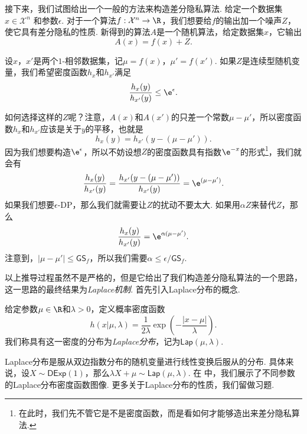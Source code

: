 接下来，我们试图给出一个一般的方法来构造差分隐私算法. 给定一个数据集$x \in \mathcal X^n$ 和参数$\epsilon$. 对于一个算法$f:\mathcal X^n \to \R$，我们想要给$f$的输出加一个噪声$Z$，使它具有差分隐私的性质. 新得到的算法$A$是一个随机算法，给定数据集$x$，它输出
\[
    A(x)=f(x)+Z.
\]

设$x$，$x'$是两个$1$-相邻数据集，记$\mu = f(x)$，$\mu' = f(x')$. 如果$Z$是连续型随机变量，我们希望密度函数$h_{x}$和$h_{x'}$满足
\[
    \frac{h_{x}(y)}{h_{x'}(y)} \leq \e^{\epsilon}.
\]

如何选择这样的$Z$呢？注意，$A(x)$和$A(x')$的只差一个常数$\mu - \mu'$，所以密度函数$h_{x}$和$h_{x'}$应该是关于$y$的平移，也就是
\[
    h_{x}(y) = h_{x'}(y - (\mu - \mu')).
\]
因为我们想要构造$\e^\epsilon$，所以不妨设想$Z$的密度函数具有指数$\e^{-x}$的形式\footnote{在此时，我们先不管它是不是密度函数，而是看如何才能够造出来差分隐私算法.}，我们就会有
\[
    \frac{h_{x}(y)}{h_{x'}(y)} = \frac{h_{x'}(y - (\mu - \mu'))}{h_{x'}(y)} = \e^{(\mu - \mu')}.
\]
如果我们想要$\epsilon$-DP，那么我们就需要让$Z$的扰动不要太大. 如果用$\alpha Z$来替代$Z$，那么
\[
    \frac{h_{x}(y)}{h_{x'}(y)} = \e^{\alpha(\mu - \mu')}.
\]
注意到，$|\mu - \mu'| \leq \mathsf{GS}_f$，所以我们需要$\alpha \leq \epsilon/\mathsf{GS}_f$.

以上推导过程虽然不是严格的，但是它给出了我们构造差分隐私算法的一个思路，这一思路的最终结果为\emph{Laplace机制}. 首先引入Laplace分布的概念.

\begin{definition}[Laplace分布]
    给定参数$\mu\in\R$和$\lambda>0$，定义概率密度函数
        \[h(x  | \mu, \lambda) = \frac1{2\lambda}\exp\left(- \frac{|x - \mu|}{\lambda}\right).\]
我们称具有这一密度的分布为\emph{Laplace分布}，记为$\mathsf{Lap}(\mu,\lambda)$.
\end{definition}

Laplace分布是服从双边指数分布的随机变量进行线性变换后服从的分布. 具体来说，设$X\sim\mathsf{DExp}(1)$，那么$\lambda X+\mu\sim\mathsf{Lap}(\mu,\lambda)$. 在 中，我们展示了不同参数的Laplace分布密度函数图像. 更多关于Laplace分布的性质，我们留做习题. 

